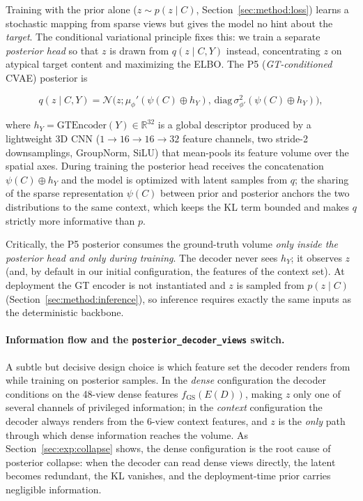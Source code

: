 Training with the prior alone ($z\sim p(z\mid C)$,
Section~\ref{sec:method:loss}) learns a stochastic mapping from sparse
views but gives the model no hint about the \emph{target}. The
conditional variational principle fixes this: we train a separate
\emph{posterior head} so that $z$ is drawn from
$q(z\mid C, Y)$ instead, concentrating $z$ on atypical target content
and maximizing the ELBO. The P5 (\emph{GT-conditioned} CVAE) posterior
is

\begin{equation}
    q(z\mid C, Y) = \mathcal{N}\big(z; \mu_\phi'(\psi(C)\oplus h_Y), \,
        \mathrm{diag}\,\sigma_{\phi'}^2(\psi(C)\oplus h_Y)\big),
    \label{eq:posterior}
\end{equation}

where $h_Y=\mathrm{GTEncoder}(Y)\in\mathbb{R}^{32}$ is a global
descriptor produced by a lightweight 3D CNN ($1\to16\to16\to32$ feature
channels, two stride-2 downsamplings, GroupNorm, SiLU) that mean-pools
its feature volume over the spatial axes. During training the posterior
head receives the concatenation $\psi(C)\oplus h_Y$ and the model is
optimized with latent samples from $q$; the sharing of the sparse
representation $\psi(C)$ between prior and posterior anchors the two
distributions to the same context, which keeps the KL term bounded and
makes $q$ strictly more informative than $p$.

Critically, the P5 posterior consumes the ground-truth volume
\emph{only inside the posterior head and only during training}. The
decoder never sees $h_Y$; it observes $z$ (and, by default in our
initial configuration, the features of the context set). At deployment
the GT encoder is not instantiated and $z$ is sampled from $p(z\mid C)$
(Section~\ref{sec:method:inference}), so inference requires exactly the
same inputs as the deterministic backbone.

\paragraph{Information flow and the \texttt{posterior\_decoder\_views}
switch.}
A subtle but decisive design choice is which feature set the decoder
renders from while training on posterior samples. In the \emph{dense}
configuration the decoder conditions on the 48-view dense features
$f_{\mathrm{GS}}(E(D))$, making $z$ only one of several channels of
privileged information; in the \emph{context} configuration the decoder
always renders from the 6-view context features, and $z$ is the \emph{only}
path through which dense information reaches the volume. As
Section~\ref{sec:exp:collapse} shows, the dense configuration is the
root cause of posterior collapse: when the decoder can read dense views
directly, the latent becomes redundant, the KL vanishes, and the
deployment-time prior carries negligible information.

